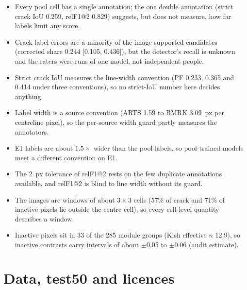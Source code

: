 \begin{itemize}
  \item Every pool cell has a single annotation; the one double annotation (strict crack IoU 0.259, relF1@2 0.829) suggests, but
  does not measure, how far labels limit any score.
  \item Crack label errors are a minority of the image-supported candidates (corrected share 0.244 [0.105, 0.436]), but the
  detector's recall is unknown and the raters were runs of one model, not independent people.
  \item Strict crack IoU measures the line-width convention (PF 0.233, 0.365 and 0.414 under three conventions), so no strict-IoU
  number here decides anything.
  \item Label width is a source convention (ARTS 1.59 to BMRK 3.09~px per centreline pixel), so the per-source width guard partly
  measures the annotators.
  \item E1 labels are about $1.5\times$ wider than the pool labels, so pool-trained models meet a different convention on E1.
  \item The 2~px tolerance of relF1@2 rests on the few duplicate annotations available, and relF1@2 is blind to line width without
  its guard.
  \item The images are windows of about $3\times3$ cells (57\% of crack and 71\% of inactive pixels lie outside the centre cell),
  so every cell-level quantity describes a window.
  \item Inactive pixels sit in 33 of the 285 module groups (Kish effective $n$ 12.9), so inactive contrasts carry intervals of about
  $\pm$0.05 to $\pm$0.06 (audit estimate).
\end{itemize}

\section{Data, test50 and licences}\label{sec:lim-data}

